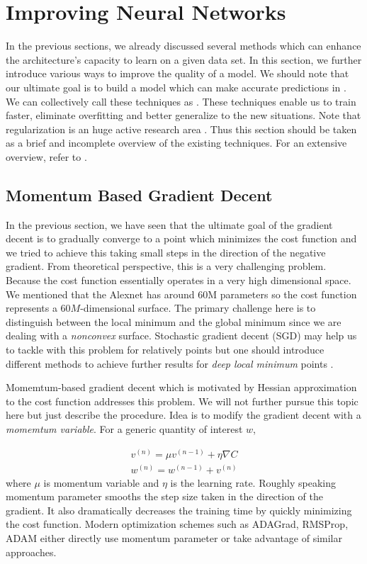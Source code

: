 \documentclass[12pt]{article}
\begin{document}
\section{Improving Neural Networks}
In the previous sections, we already discussed several methods which can enhance the architecture's capacity to learn on a given data set. In this section, we further introduce various ways to improve the quality of a model. We should note that our ultimate goal is to  build a model  which can make accurate predictions in . We can collectively call these techniques as . These techniques enable us to train faster, eliminate overfitting and better generalize to the new situations. Note that regularization is an huge active research area . Thus this section should be taken as a brief and incomplete overview of the existing techniques. For an extensive overview, refer to \cite{prac}.



\subsection{Momentum Based Gradient Decent}
In the previous section, we have seen that the ultimate goal of the gradient decent is to gradually converge to a point which minimizes the cost function and we tried to achieve this taking small steps in the direction of the negative gradient. From theoretical perspective, this is a very challenging problem. Because the cost function essentially operates in a very high dimensional space. We mentioned that  the Alexnet has around 60M parameters so the cost function represents a $60M$-dimensional surface. The primary challenge here is to distinguish between the local minimum and the global minimum since we are dealing with a \textit{nonconvex} surface.  Stochastic gradient decent (SGD) may help us to tackle with this problem for relatively  points but one should introduce different methods to achieve further results for \textit{deep local minimum} points \cite{fund}.

Momemtum-based gradient decent which is motivated by Hessian approximation to the cost function  addresses this problem. We will not further pursue this topic here but just describe the procedure. Idea is to modify the gradient decent with a \textit{momemtum variable}. For a generic quantity of interest $w$,


\begin{equation}
\begin{split}
v^{(n)} = \mu v^{(n-1)} + \eta \nabla C \\
w^{(n)} = w^{(n-1)} + v^{(n)}
\end{split}
\end{equation}
where $\mu$ is momentum variable and $\eta$ is the learning rate. Roughly speaking momentum parameter smooths the step size taken in the direction of the gradient. It also dramatically decreases the training time by quickly minimizing the cost function. Modern optimization schemes such as ADAGrad, RMSProp, ADAM either directly use momentum parameter or take advantage of similar approaches. 
\end{document}
